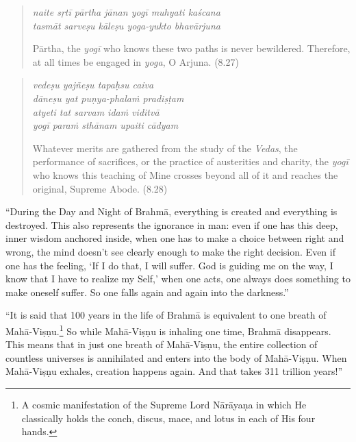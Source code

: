 \documentclass[12pt, twoside, openright]{memoir}
\begin{document}
\par
\begin{verse}
\textit{naite sṛtī pārtha jānan yogī muhyati kaścana} \\
\textit{tasmāt sarveṣu kāleṣu yoga-yukto bhavārjuna}

\noindent Pārtha, the \textit{yogī} who knows these two paths is never bewildered. Therefore, at all times be engaged in \textit{yoga}, O Arjuna. (8.27)
\end{verse}
\par



\par
\begin{verse}
\textit{vedeṣu yajñeṣu tapaḥsu caiva} \\
\textit{dāneṣu yat puṇya-phalaṁ pradiṣṭam} \\
\textit{atyeti tat sarvam idaṁ viditvā} \\
\textit{yogī paraṁ sthānam upaiti cādyam}

\noindent Whatever merits are gathered from the study of the \textit{Vedas}, the performance of sacrifices, or the practice of austerities and charity, the \textit{yogī} who knows this teaching of Mine crosses beyond all of it and reaches the original, Supreme Abode. (8.28)
\end{verse}
\par


\enquote{During the Day and Night of Brahmā, everything is created and everything is destroyed. This also represents the ignorance in man: even if one has this deep, inner wisdom anchored inside, when one has to make a choice between right and wrong, the mind doesn’t see clearly enough to make the right decision. Even if one has the feeling, \enquote{If I do that, I will suffer. God is guiding me on the way, I know that I have to realize my Self,} when one acts, one always does something to make oneself suffer. So one falls again and again into the darkness.}

\enquote{It is said that 100 years in the life of Brahmā is equivalent to one breath of Mahā-Viṣṇu.\footnote{A cosmic manifestation of the Supreme Lord Nārāyaṇa in which He classically holds the conch, discus, mace, and lotus in each of His four hands.} So while Mahā-Viṣṇu is inhaling one time, Brahmā disappears. This means that in just one breath of Mahā-Viṣṇu, the entire collection of countless universes is annihilated and enters into the body of Mahā-Viṣṇu. When Mahā-Viṣṇu exhales, creation happens again. And that takes 311 trillion years!}
\end{document}
